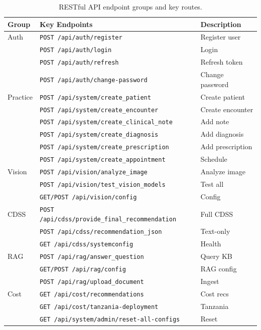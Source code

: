 \documentclass[12pt,a4paper]{report}
\begin{document}
		\begin{table}[H]
			\centering
			\footnotesize
			\caption{RESTful API endpoint groups and key routes.}
			\label{tab:api_endpoints}
			\begin{tabularx}{\textwidth}{>{\raggedright\arraybackslash}p{2.2cm} X >{\raggedright\arraybackslash}p{3.8cm}}
				\toprule
				\textbf{Group} & \textbf{Key Endpoints} & \textbf{Description} \\
				\midrule
				Auth
				& \texttt{POST /api/auth/register}       & Register user \\
				& \texttt{POST /api/auth/login}          & Login \\
				& \texttt{POST /api/auth/refresh}        & Refresh token \\
				& \texttt{POST /api/auth/change-password}& Change password \\
				\midrule
				Practice
				& \texttt{POST /api/system/create\_patient}      & Create patient \\
				& \texttt{POST /api/system/create\_encounter}    & Create encounter \\
				& \texttt{POST /api/system/create\_clinical\_note}& Add note \\
				& \texttt{POST /api/system/create\_diagnosis}    & Add diagnosis \\
				& \texttt{POST /api/system/create\_prescription} & Add prescription \\
				& \texttt{POST /api/system/create\_appointment}  & Schedule \\
				\midrule
				Vision
				& \texttt{POST /api/vision/analyze\_image}      & Analyze image \\
				& \texttt{POST /api/vision/test\_vision\_models} & Test all \\
				& \texttt{GET/POST /api/vision/config}          & Config \\
				\midrule
				CDSS
				& \texttt{POST /api/cdss/provide\_final\_recommendation} & Full CDSS \\
				& \texttt{POST /api/cdss/recommendation\_json}          & Text-only \\
				& \texttt{GET  /api/cdss/systemconfig}                  & Health \\
				\midrule
				RAG
				& \texttt{POST /api/rag/answer\_question}  & Query KB \\
				& \texttt{GET/POST /api/rag/config}        & RAG config \\
				& \texttt{POST /api/rag/upload\_document}  & Ingest \\
				\midrule
				Cost
				& \texttt{GET /api/cost/recommendations}         & Cost recs \\
				& \texttt{GET /api/cost/tanzania-deployment}     & Tanzania \\
				& \texttt{GET /api/system/admin/reset-all-configs} & Reset \\
				\bottomrule
			\end{tabularx}
		\end{table}
	
\end{document}
